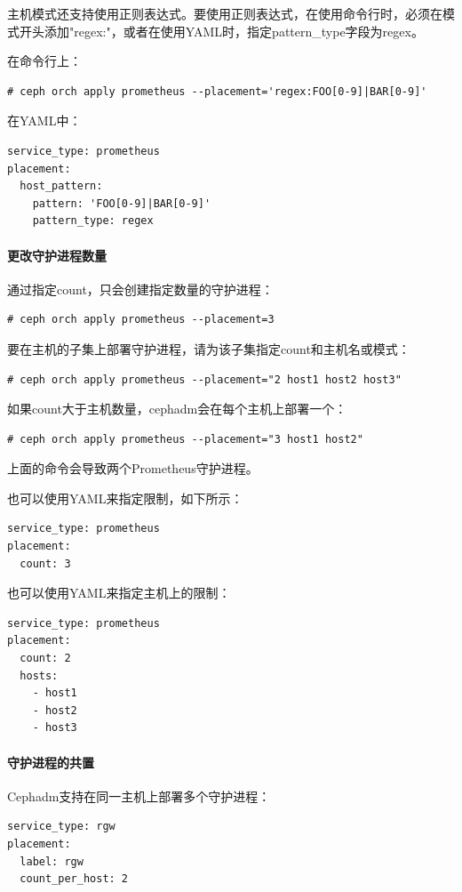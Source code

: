 \documentclass[12pt,UTF8]{ctexbook}
\begin{document}
主机模式还支持使用正则表达式。要使用正则表达式，在使用命令行时，必须在模式开头添加"regex:"，或者在使用YAML时，指定pattern_type字段为regex。

在命令行上：
\begin{verbatim}
# ceph orch apply prometheus --placement='regex:FOO[0-9]|BAR[0-9]'
\end{verbatim}

在YAML中：
\begin{verbatim}
service_type: prometheus
placement:
  host_pattern:
    pattern: 'FOO[0-9]|BAR[0-9]'
    pattern_type: regex
\end{verbatim}

\paragraph{更改守护进程数量}

通过指定count，只会创建指定数量的守护进程：
\begin{verbatim}
# ceph orch apply prometheus --placement=3
\end{verbatim}

要在主机的子集上部署守护进程，请为该子集指定count和主机名或模式：
\begin{verbatim}
# ceph orch apply prometheus --placement="2 host1 host2 host3"
\end{verbatim}

如果count大于主机数量，cephadm会在每个主机上部署一个：
\begin{verbatim}
# ceph orch apply prometheus --placement="3 host1 host2"
\end{verbatim}

上面的命令会导致两个Prometheus守护进程。

也可以使用YAML来指定限制，如下所示：
\begin{verbatim}
service_type: prometheus
placement:
  count: 3
\end{verbatim}

也可以使用YAML来指定主机上的限制：
\begin{verbatim}
service_type: prometheus
placement:
  count: 2
  hosts:
    - host1
    - host2
    - host3
\end{verbatim}

\paragraph{守护进程的共置}

Cephadm支持在同一主机上部署多个守护进程：
\begin{verbatim}
service_type: rgw
placement:
  label: rgw
  count_per_host: 2
\end{verbatim}
\end{document}
